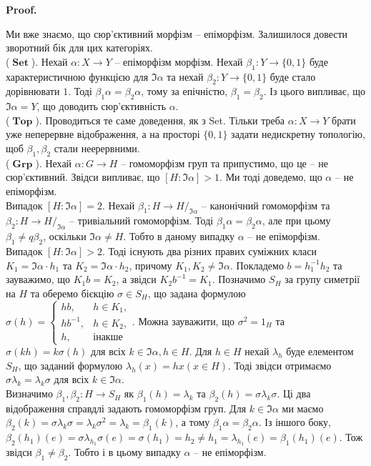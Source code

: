 \documentclass[a4paper, 10pt]{article}
\makeatletter
\theoremstyle{theoremdd}
\renewenvironment{proof}[1][Proof.\\]{\par
\pushQED{\hfill \qed}%
\normalfont \topsep6\p@\@plus6\p@\relax
\trivlist
\item\relax
{\bfseries
#1\@addpunct{.}}\hspace\labelsep\ignorespaces
}{%
\popQED\endtrivlist\@endpefalse
}
\DeclareMathOperator{\Set}{\textbf{Set}}
\DeclareMathOperator{\Grp}{\textbf{Grp}}
\DeclareMathOperator{\Top}{\textbf{Top}}
\makeatother
\begin{document}
\begin{proof}
Ми вже знаємо, що сюр'єктивний морфізм -- епіморфізм. Залишилося довести зворотний бік для цих категоріях.
\bigskip \\
($\Set$). Нехай $\alpha \colon X \to Y$ -- епіморфізм морфізм. Нехай $\beta_1 \colon Y \to \{0,1\}$ буде характеристичною функцією для $\Im \alpha$ та нехай $\beta_2 \colon Y \to \{0,1\}$ буде стало дорівнювати $1$. Тоді $\beta_1 \alpha = \beta_2 \alpha$, тому за епічністю, $\beta_1 = \beta_2$. Із цього випливає, що $\Im \alpha = Y$, що доводить сюр'єктивність $\alpha$.
\bigskip \\
($\Top$). Проводиться те саме доведення, як з Set. Тільки треба $\alpha \colon X \to Y$ брати уже неперервне відображення, а на просторі $\{0,1\}$ задати недискретну топологію, щоб $\beta_1,\beta_2$ стали неерервними.
\bigskip \\
($\Grp$). Нехай $\alpha \colon G \to H$ -- гомоморфізм груп та припустимо, що це -- не сюр'єктивний. Звідси випливає, що $[H:\Im \alpha] > 1$. Ми тоді доведемо, що $\alpha$ -- не епіморфізм.\\
Випадок $[H:\Im \alpha] = 2$. Нехай $\beta_1 \colon H \to H/_{\Im \alpha}$ -- канонічний гомоморфізм та $\beta_2 \colon H \to H/_{\Im \alpha}$ -- тривіальний гомоморфізм. Тоді $\beta_1 \alpha = \beta_2 \alpha$, але при цьому $\beta_1 \ne q\beta_2$, оскільки $\Im \alpha \neq H$. Тобто в даному випадку $\alpha$ -- не епіморфізм.\\
Випадок $[H:\Im \alpha] > 2$. Тоді існують два різних правих суміжних класи $K_1 = \Im \alpha \cdot h_1$ та $K_2 = \Im \alpha \cdot h_2$, причому $K_1,K_2 \neq \Im \alpha$. Покладемо $b = h_1^{-1}h_2$ та зауважимо, що $K_1b = K_2$, а звідси $K_2b^{-1} = K_1$. Позначимо $S_H$ за групу симетрії на $H$ та оберемо бієкцію $\sigma \in S_H$, що задана формулою $\sigma(h) = \begin{cases} hb, & h \in K_1, \\ hb^{-1}, & h \in K_2, \\ h, & \text{інакше} \end{cases}$. Можна зауважити, що $\sigma^2 = 1_H$ та $\sigma(kh) = k \sigma(h)$ для всіх $k \in \Im \alpha, h \in H$. Для $h \in H$ нехай $\lambda_h$ буде елементом $S_H$, що заданий формулою $\lambda_h(x) = hx (x \in H)$. Тоді звідси отримаємо $\sigma \lambda_k = \lambda_k \sigma$ для всіх $k \in \Im \alpha$.\\
Визначимо $\beta_1,\beta_2 \colon H \to S_H$ як $\beta_1(h) = \lambda_k$ та $\beta_2(h) = \sigma \lambda_k \sigma
$. Ці два відображення справдлі задають гомоморфізм груп. Для $k \in \Im \alpha$ ми маємо\\
$\beta_2(k) = \sigma \lambda_k \sigma = \lambda_k \sigma^2 = \lambda_k = \beta_1(k)$, а тому $\beta_1 \alpha = \beta_2 \alpha$. Із іншого боку, $\beta_2(h_1)(e) = \sigma \lambda_{h_1} \sigma (e) = \sigma(h_1) = h_2 \neq h_1 = \lambda_{h_1}(e) = \beta_1(h_1)(e)$. Тож звідси $\beta_1 \neq \beta_2$. Тобто і в цьому випадку $\alpha$ -- не епіморфізм.
\end{proof}
\end{document}
